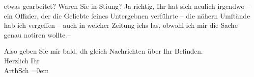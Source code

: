                etwas gearbeitet? Waren Sie in Sti{\geminationm}ung? Ja richtig, Ihr
                  \label{K_L02951-5v}\label{K_L02951-5h} hat sich neulich
               irgendwo \label{K_L02951-6v}\label{K_L02951-6h} – ein
               Offizier, der die Geliebte ſeines Untergebnen verführte – die nähern Umſtände hab ich
               vergeſſen – auch {\pb}in welcher Zeitung ichs
               las, obwohl ich mir die Sache genau notiren wollte\textcolor{gray}{.}– \pend
           
\pstart
           Also geben Sie mir bald\textcolor{gray}{,} dh gleich Nachrichten über Ihr
               Befinden. {\\[\baselineskip]}Herzlich Ihr {\\[\baselineskip]}\spacefill\mbox{ArthSch}\pend
           \leftskip=0em{}\endnumbering{}  
      